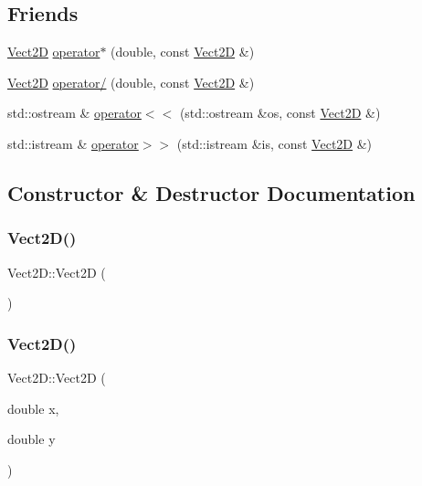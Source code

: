 \subsection*{Friends}
\begin{DoxyCompactItemize}
\item 
\hyperlink{classVect2D}{Vect2D} \hyperlink{classVect2D_a48631d6a1c75eb08d287e3c4c4e3c95e_a48631d6a1c75eb08d287e3c4c4e3c95e}{operator$\ast$} (double, const \hyperlink{classVect2D}{Vect2D} \&)
\item 
\hyperlink{classVect2D}{Vect2D} \hyperlink{classVect2D_a024a271ab52db1ae67332c062797f6f4_a024a271ab52db1ae67332c062797f6f4}{operator/} (double, const \hyperlink{classVect2D}{Vect2D} \&)
\item 
std\+::ostream \& \hyperlink{classVect2D_a7e68af9444ebe81a72ba4eec633f4d65_a7e68af9444ebe81a72ba4eec633f4d65}{operator$<$$<$} (std\+::ostream \&os, const \hyperlink{classVect2D}{Vect2D} \&)
\item 
std\+::istream \& \hyperlink{classVect2D_ad8969df375ebf041a3f9ccdb635357fd_ad8969df375ebf041a3f9ccdb635357fd}{operator$>$$>$} (std\+::istream \&is, const \hyperlink{classVect2D}{Vect2D} \&)
\end{DoxyCompactItemize}


\subsection{Constructor \& Destructor Documentation}
\mbox{\label{classVect2D_a6c93f0ad4edc535515d33f8e8f6b7842_a6c93f0ad4edc535515d33f8e8f6b7842}} 
\subsubsection{\texorpdfstring{Vect2\+D()}{Vect2D()}\hspace{0.1cm}{\footnotesize\ttfamily [1/3]}}
{\footnotesize\ttfamily Vect2\+D\+::\+Vect2D (\begin{DoxyParamCaption}{ }\end{DoxyParamCaption})}

\mbox{\label{classVect2D_ac977f3d217a9ad80f39fcf28a7b217f3_ac977f3d217a9ad80f39fcf28a7b217f3}} 
\subsubsection{\texorpdfstring{Vect2\+D()}{Vect2D()}\hspace{0.1cm}{\footnotesize\ttfamily [2/3]}}
{\footnotesize\ttfamily Vect2\+D\+::\+Vect2D (\begin{DoxyParamCaption}\item[{double}]{x,  }\item[{double}]{y }\end{DoxyParamCaption})}

